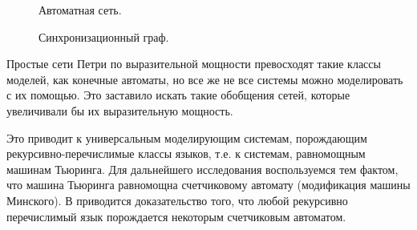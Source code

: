 \begin{figure}
	\begin{minipage}[H]{0.49\linewidth}
		\caption{Автоматная сеть.}
		\label{fig:fig1}
	\end{minipage}
	\hfill
	\begin{minipage}[H]{0.49\linewidth}
		\caption{Синхронизационный граф.}
		\label{fig:fig2}
	\end{minipage}
\end{figure}
	
Простые сети Петри по выразительной мощности превосходят такие классы моделей, как конечные автоматы, но все же не все системы можно моделировать с их помощью. Это заставило искать такие обобщения сетей, которые увеличивали бы их выразительную мощность.

Это приводит к универсальным моделирующим системам, порождающим рекурсивно-перечислимые классы языков, т.е. к системам, равномощным машинам Тьюринга. Для дальнейшего исследования воспользуемся тем фактом, что машина Тьюринга равномощна счетчиковому автомату (модификация машины Минского). В \cite{Kotov} приводится доказательство того, что любой рекурсивно перечислимый язык порождается некоторым счетчиковым автоматом.

